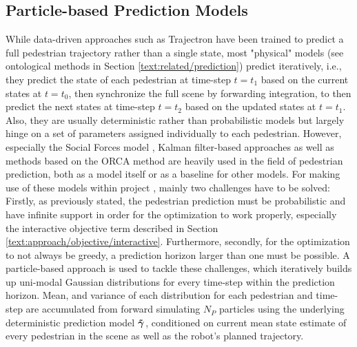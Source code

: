 \subsection{Particle-based Prediction Models} 
\label{text:exp_particles}
While data-driven approaches such as Trajectron \cite{Ivanovic2018} have been trained to predict a full pedestrian trajectory rather than a single state, most "physical" models (see ontological methods in Section \ref{text:related/prediction}) predict iteratively, i.e., they predict the state of each pedestrian at time-step $t = t_1$ based on the current states at $t = t_0$, then synchronize the full scene by forwarding integration, to then predict the next states at time-step $t = t_2$ based on the updated states at $t = t_1$. Also, they are usually deterministic rather than probabilistic models but largely hinge on a set of parameters assigned individually to each pedestrian. However, especially the Social Forces model \cite{Helbing1995}, Kalman filter-based approaches \cite{Schneider2013}\cite{Rehder2015}\cite{Guo2016} as well as methods based on the \ac{ORCA} method \cite{vandenBerg2011}\cite{Luo2018a}\cite{Charlton2019} are heavily used in the field of pedestrian prediction, both as a model itself or as a baseline for other models. 
\newline
For making use of these models within project \project, mainly two challenges have to be solved: Firstly, as previously stated, the pedestrian prediction must be probabilistic and have infinite support in order for the optimization to work properly, especially the interactive objective term described in Section \ref{text:approach/objective/interactive}. Furthermore, secondly, for the optimization to not always be greedy, a prediction horizon larger than one must be possible. 
\newline
A particle-based approach is used to tackle these challenges, which iteratively builds up uni-modal Gaussian distributions for every time-step within the prediction horizon. Mean, and variance of each distribution for each pedestrian and time-step are accumulated from forward simulating $N_P$ particles using the underlying deterministic prediction model $\distmodeldet[]$, conditioned on current mean state estimate of every pedestrian in the scene as well as the robot's planned trajectory. 

